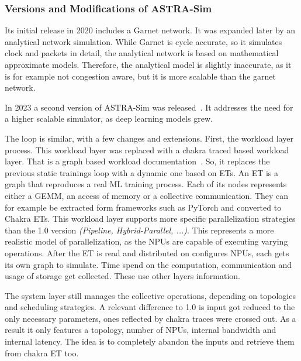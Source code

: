 \subsubsection*{Versions and Modifications of ASTRA-Sim}
\label{sec:comparison}
Its initial release in 2020 includes a Garnet network. It was expanded later by an analytical network simulation. While Garnet is cycle accurate, so it simulates clock and packets in detail, the analytical network is based on mathematical approximate models. Therefore, the analytical model is slightly inaccurate, as it is for example not congestion aware, but it is more scalable than the garnet network.

In 2023 a second version of \ac{ASTRA-Sim} was released~\cite{won_astra-sim20_2023}. It addresses the need for a higher scalable simulator, as deep learning models grew. %

The loop is similar, with a few changes and extensions.
First, the workload layer process. This workload layer was replaced with a chakra traced based workload layer. That is a graph based workload documentation~\cite{sridharan_chakra_2023}.
So, it replaces the previous static trainings loop with a dynamic one based on \acp{ET}. An \ac{ET} is a graph that reproduces a real \ac{ML} training process. Each of its nodes represents either a \ac{GEMM}, an access of memory or a collective communication. They can for example be extracted form frameworks such as PyTorch and converted to Chakra \acp{ET}.
This workload layer supports more specific parallelization strategies than the 1.0 version \textit{(Pipeline, Hybrid-Parallel, ...)}. %
This represents a more realistic model of parallelization, as the \acp{NPU} are capable of executing varying operations. 
After the \ac{ET} is read and distributed on configures \acp{NPU}, each gets its own graph to simulate. Time spend on the computation, communication and usage of storage get collected. These use other layers information.

The system layer still manages the collective operations, depending on topologies and scheduling strategies. A relevant difference to 1.0 is input got reduced to the only necessary parameters, ones reflected by chakra traces were crossed out. As a result it only features a topology, number of \acp{NPU}, internal bandwidth and internal latency. %
The idea is to completely abandon the inputs and retrieve them from chakra \ac{ET} too.

